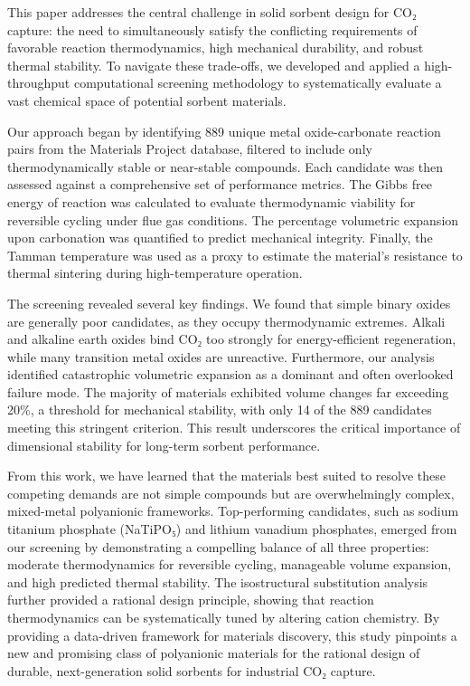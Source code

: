 \documentclass[]{article}
\begin{document}
This paper addresses the central challenge in solid sorbent design for CO₂ capture: the need to simultaneously satisfy the conflicting requirements of favorable reaction thermodynamics, high mechanical durability, and robust thermal stability. To navigate these trade-offs, we developed and applied a high-throughput computational screening methodology to systematically evaluate a vast chemical space of potential sorbent materials.

Our approach began by identifying 889 unique metal oxide-carbonate reaction pairs from the Materials Project database, filtered to include only thermodynamically stable or near-stable compounds. Each candidate was then assessed against a comprehensive set of performance metrics. The Gibbs free energy of reaction was calculated to evaluate thermodynamic viability for reversible cycling under flue gas conditions. The percentage volumetric expansion upon carbonation was quantified to predict mechanical integrity. Finally, the Tamman temperature was used as a proxy to estimate the material's resistance to thermal sintering during high-temperature operation.

The screening revealed several key findings. We found that simple binary oxides are generally poor candidates, as they occupy thermodynamic extremes. Alkali and alkaline earth oxides bind CO₂ too strongly for energy-efficient regeneration, while many transition metal oxides are unreactive. Furthermore, our analysis identified catastrophic volumetric expansion as a dominant and often overlooked failure mode. The majority of materials exhibited volume changes far exceeding 20\%, a threshold for mechanical stability, with only 14 of the 889 candidates meeting this stringent criterion. This result underscores the critical importance of dimensional stability for long-term sorbent performance.

From this work, we have learned that the materials best suited to resolve these competing demands are not simple compounds but are overwhelmingly complex, mixed-metal polyanionic frameworks. Top-performing candidates, such as sodium titanium phosphate (NaTiPO₅) and lithium vanadium phosphates, emerged from our screening by demonstrating a compelling balance of all three properties: moderate thermodynamics for reversible cycling, manageable volume expansion, and high predicted thermal stability. The isostructural substitution analysis further provided a rational design principle, showing that reaction thermodynamics can be systematically tuned by altering cation chemistry. By providing a data-driven framework for materials discovery, this study pinpoints a new and promising class of polyanionic materials for the rational design of durable, next-generation solid sorbents for industrial CO₂ capture.
\end{document}
